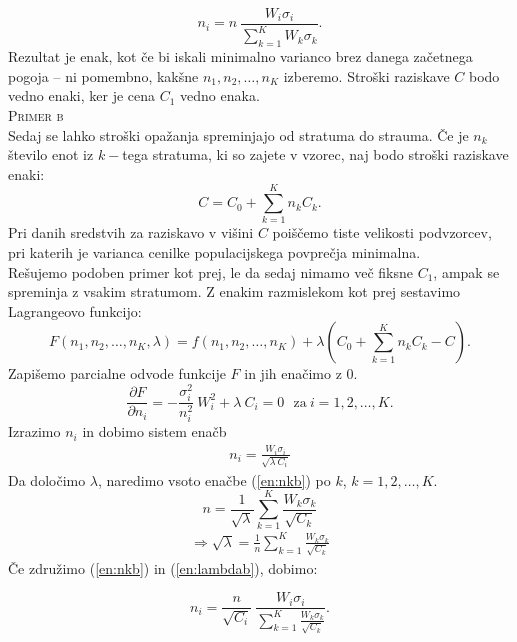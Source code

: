 \documentclass[a4paper,12pt]{article}
\begin{document}
$$ n_i = n \ \frac{W_i \sigma_i}{\sum_{k = 1}^{K} W_k \sigma_k}. $$
Rezultat je enak, kot če bi iskali minimalno varianco brez danega začetnega pogoja -- ni pomembno, kakšne $n_1, n_2, \ldots, n_K$ izberemo. Stroški raziskave $C$ bodo vedno enaki, ker je cena $C_1$ vedno enaka.
\\

\noindent
\textsc{Primer b}
\\
Sedaj se lahko stroški opažanja spreminjajo od stratuma do strauma. Če je $n_k$ število enot iz $k-$tega stratuma, ki so zajete v vzorec, naj bodo stroški raziskave enaki:
$$ C = C_0 + \sum_{k = 1}^{K}n_k C_k. $$
Pri danih sredstvih za raziskavo v višini $C$ poiščemo tiste velikosti podvzorcev, pri katerih je varianca cenilke populacijskega povprečja minimalna.
\\
Rešujemo podoben primer kot prej, le da sedaj nimamo več fiksne $C_1$, ampak se spreminja z vsakim stratumom. 
Z enakim razmislekom kot prej sestavimo Lagrangeovo funkcijo:
$$ F(n_1, n_2, \ldots, n_K, \lambda) = f(n_1, n_2, \ldots, n_K) + \lambda (C_0 + \sum_{k = 1}^{K} n_k C_k - C). $$
Zapišemo parcialne odvode funkcije $F$ in jih enačimo z $0$.
$$ \frac{ \partial F}{\partial n_i} = - \frac{ \sigma_i^2}{n_i^2} \  W_i^2 + \lambda \ C_i = 0 \ \ \ \text{za} \ i = 1, 2, \ldots, K.  $$
Izrazimo $n_i$ in dobimo sistem enačb
\begin{align}\label{en:nkb}
n_i = \frac{W_i \sigma_i}{ \sqrt{ \lambda \ C_i}}
\end{align}
Da določimo $\lambda$, naredimo vsoto enačbe (\ref{en:nkb}) po $k$, $k = 1, 2, \ldots, K.$
$$ n = \frac{1}{\sqrt{\lambda}} \sum_{k = 1}^{K} \frac{W_k \sigma_k}{\sqrt{C_k}} $$
\begin{align}\label{en:lambdab}
\Rightarrow \sqrt{\lambda} = \frac{1}{n} \sum_{k = 1}^{K} \frac{W_k \sigma_k}{\sqrt{C_k}}
\end{align}
Če združimo (\ref{en:nkb}) in (\ref{en:lambdab}), dobimo:

$$ n_i = \frac{n}{\sqrt{C_i}} \ \frac{W_i \sigma_i}{\sum_{k = 1}^{K} \frac{W_k \sigma_k}{\sqrt{C_k}}}. $$
\\
\end{document}
